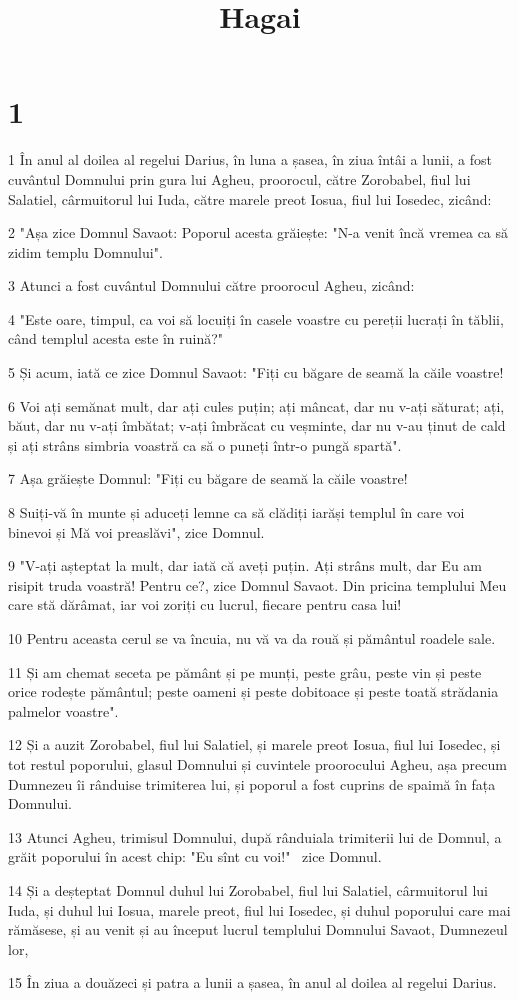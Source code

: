 

\title{Hagai}


\chapter{1}

\par 1 În anul al doilea al regelui Darius, în luna a șasea, în ziua întâi a lunii, a fost cuvântul Domnului prin gura lui Agheu, proorocul, către Zorobabel, fiul lui Salatiel, cârmuitorul lui Iuda, către marele preot Iosua, fiul lui Iosedec, zicând:
\par 2 "Așa zice Domnul Savaot: Poporul acesta grăiește: "N-a venit încă vremea ca să zidim templu Domnului".
\par 3 Atunci a fost cuvântul Domnului către proorocul Agheu, zicând:
\par 4 "Este oare, timpul, ca voi să locuiți în casele voastre cu pereții lucrați în tăblii, când templul acesta este în ruină?"
\par 5 Și acum, iată ce zice Domnul Savaot: "Fiți cu băgare de seamă la căile voastre!
\par 6 Voi ați semănat mult, dar ați cules puțin; ați mâncat, dar nu v-ați săturat; ați, băut, dar nu v-ați îmbătat; v-ați îmbrăcat cu veșminte, dar nu v-au ținut de cald și ați strâns simbria voastră ca să o puneți într-o pungă spartă".
\par 7 Așa grăiește Domnul: "Fiți cu băgare de seamă la căile voastre!
\par 8 Suiți-vă în munte și aduceți lemne ca să clădiți iarăși templul în care voi binevoi și Mă voi preaslăvi", zice Domnul.
\par 9 "V-ați așteptat la mult, dar iată că aveți puțin. Ați strâns mult, dar Eu am risipit truda voastră! Pentru ce?, zice Domnul Savaot. Din pricina templului Meu care stă dărâmat, iar voi zoriți cu lucrul, fiecare pentru casa lui!
\par 10 Pentru aceasta cerul se va încuia, nu vă va da rouă și pământul roadele sale.
\par 11 Și am chemat seceta pe pământ și pe munți, peste grâu, peste vin și peste orice rodește pământul; peste oameni și peste dobitoace și peste toată strădania palmelor voastre".
\par 12 Și a auzit Zorobabel, fiul lui Salatiel, și marele preot Iosua, fiul lui Iosedec, și tot restul poporului, glasul Domnului și cuvintele proorocului Agheu, așa precum Dumnezeu îi rânduise trimiterea lui, și poporul a fost cuprins de spaimă în fața Domnului.
\par 13 Atunci Agheu, trimisul Domnului, după rânduiala trimiterii lui de Domnul, a grăit poporului în acest chip: "Eu sînt cu voi!"  zice Domnul.
\par 14 Și a deșteptat Domnul duhul lui Zorobabel, fiul lui Salatiel, cârmuitorul lui Iuda, și duhul lui Iosua, marele preot, fiul lui Iosedec, și duhul poporului care mai rămăsese, și au venit și au început lucrul templului Domnului Savaot, Dumnezeul lor,
\par 15 În ziua a douăzeci și patra a lunii a șasea, în anul al doilea al regelui Darius.

